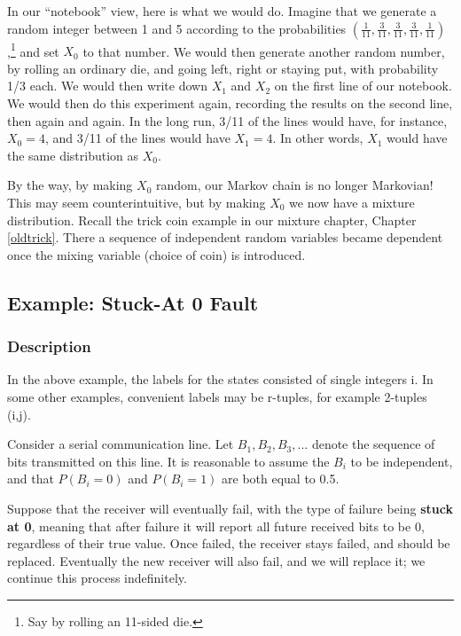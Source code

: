 In our ``notebook'' view, here is what we would do.  Imagine that we
generate a random integer between 1 and 5 according to the probabilities
$(\frac{1}{11},\frac{3}{11},\frac{3}{11},\frac{3}{11},
\frac{1}{11})$,\footnote{Say by rolling an 11-sided die.} and set $X_0$
to that number.  We would then generate another random number, by
rolling an ordinary die, and going left, right or staying put, with
probability 1/3 each.  We would then write down $X_1$ and $X_2$ on the
first line of our notebook.  We would then do this experiment again,
recording the results on the second line, then again and again.  In the
long run, 3/11 of the lines would have, for instance, $X_0 = 4$, and
3/11 of the lines would have $X_1 = 4$.  In other words, $X_1$ would
have the same distribution as $X_0$.

By the way, by making $X_0$ random, our Markov chain is no longer
Markovian!  This may seem counterintuitive, but by making $X_0$ we now
have a mixture distribution.  Recall the trick coin example in our
mixture chapter, Chapter \ref{oldtrick}.  There a sequence of
independent random variables became dependent once the mixing variable
(choice of coin) is introduced.

\subsection{Example:  Stuck-At 0 Fault} 
\label{stuckat}

\subsubsection{Description}

In the above example, the labels for the states consisted of single
integers i. In some other examples, convenient labels may be r-tuples,
for example 2-tuples (i,j).

Consider a serial communication line. Let $B_{1},B_{2},B_{3},...$ denote
the sequence of bits transmitted on this line. It is reasonable to assume the
$B_{i}$ to be independent, and that $P(B_{i}=0)$ and $P(B_{i}=1)$ are
both equal to 0.5.

Suppose that the receiver will eventually fail, with the type of failure
being \textbf{stuck at 0}, meaning that after failure it will report all
future received bits to be 0, regardless of their true value. Once
failed, the receiver stays failed, and should be replaced. Eventually
the new receiver will also fail, and we will replace it; we continue
this process indefinitely.

